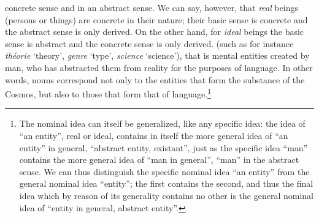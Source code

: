 \begin{sloppypar}
{{    concrete sense and in an abstract sense. We can say, however, that
    \emph{real} beings (persons or things) are concrete in their
    nature; their basic sense is concrete and the abstract sense is
    only derived. On the other hand, for \emph{ideal} beings the basic
    sense is abstract and the concrete sense is only derived.} (such
  as for instance \emph{théorie} `theory', \emph{genre} `type',
  \emph{science} `science'), that is mental entities created by man,
  who has abstracted them from reality for the purposes of
  language. In other words, nouns correspond not only to the entities
  that form the substance of the Cosmos, but also to those that form
  that of language.\footnote{The nominal idea can itself be
    generalized, like any specific idea: the idea of ``an entity'',
    real or ideal, contains in itself the more general idea of ``an
    entity'' in general, ``abstract entity, existant'', just as the
    specific idea ``man'' contains the more general idea of ``man in
    general'', ``man'' in the abstract sense. We can thus distinguish
    the specific nominal idea ``an entity'' from the general nominal
    idea ``entity''; the first contains the second, and thus the final
    idea which by reason of its generality contains no other is the
    general nominal idea of ``entity in general, abstract entity''.}
}

\end{sloppypar}
